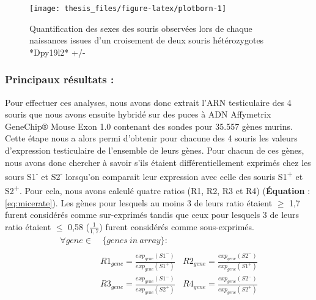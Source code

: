 \documentclass[12pt,twoside]{reedthesis}
\theoremstyle{definition}
\theoremstyle{definition}
\theoremstyle{remark}
\begin{document}
  \newpage
  
  \begin{figure}
  
  {\centering \texttt{[image: thesis\_files/figure-latex/plotborn-1]} 
  
  }
  
  \caption[Quantification des sexes des souris observées lors de chaque naissances issues d'un croisement de deux souris hétérozygotes *Dpy19l2* +/-]{Quantification des sexes des souris observées lors de chaque naissances issues d'un croisement de deux souris hétérozygotes *Dpy19l2* +/-}\label{fig:plotborn}
  \end{figure}
  
  \newpage
  
  
  
  \newpage
  
  \subsubsection{Principaux résultats :}\label{principaux-resultats-1}
  
  Pour effectuer ces analyses, nous avons donc extrait l'ARN testiculaire
  des 4 souris que nous avons ensuite hybridé sur des puces à ADN
  Affymetrix GeneChip® Mouse Exon 1.0 contenant des sondes pour 35.557
  gènes murins. Cette étape nous a alors permi d'obtenir pour chacune des
  4 souris les valeurs d'expression testiculaire de l'ensemble de leurs
  gènes. Pour chacun de ces gènes, nous avons donc chercher à savoir s'ils
  étaient différentiellement exprimés chez les sours S1\textsuperscript{-}
  et S2\textsuperscript{-} lorsqu'on comparait leur expression avec celle
  des souris S1\textsuperscript{+} et S2\textsuperscript{+}. Pour cela,
  nous avons calculé quatre ratios (R1, R2, R3 et R4) (\textbf{Équation} :
  \eqref{eq:micerate}). Les gènes pour lesquels au moins 3 de leurs ratio
  étaient \(\ge\) 1,7 furent considérés comme sur-exprimés tandis que ceux
  pour lesquels 3 de leurs ratio étaient \(\le\) 0,58 (\(\frac{1}{1,7}\))
  furent considérés comme sous-exprimés.\\
  
  \begin{equation} 
  \begin{split}
  \forall gene \in & \ \{genes\ in\ array\}: \\
  \\
  & R1_{gene} = \frac{exp_{gene}(S1^-)}{exp_{gene}(S1^+)} \ \ \ \ R2_{gene} = \frac{exp_{gene}(S2^-)}{exp_{gene}(S1^+)} \\
  & R3_{gene} = \frac{exp_{gene}(S1^-)}{exp_{gene}(S2^+)} \ \ \ \ R4_{gene} = \frac{exp_{gene}(S2^-)}{exp_{gene}(S2^+)} 
  \label{eq:micerate}
  \end{split}
  \end{equation}
  
\end{document}
